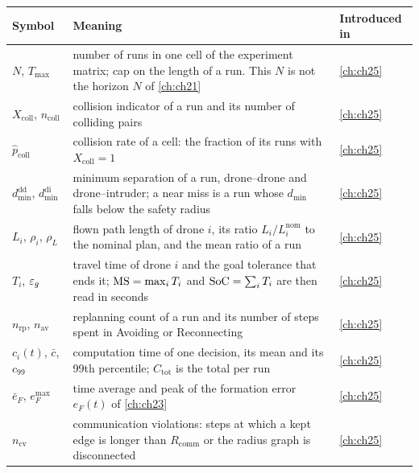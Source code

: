 {\small\renewcommand{\arraystretch}{1.0}%
\noindent\begin{tabularx}{\textwidth}{@{}lYl@{}}
\toprule
\textbf{Symbol} & \textbf{Meaning} & \textbf{Introduced in}\\
\midrule
$N$, $T_{\max}$ & number of runs in one cell of the experiment matrix; cap on the length of a run. This $N$ is not the horizon $N$ of \cref{ch:ch21} & \cref{ch:ch25}\\
$X_{\mathrm{coll}}$, $n_{\mathrm{coll}}$ & collision indicator of a run and its number of colliding pairs & \cref{ch:ch25}\\
$\hat p_{\mathrm{coll}}$ & collision rate of a cell: the fraction of its runs with $X_{\mathrm{coll}}=1$ & \cref{ch:ch25}\\
$d_{\min}^{\mathrm{dd}}$, $d_{\min}^{\mathrm{di}}$ & minimum separation of a run, drone--drone and drone--intruder; a near miss is a run whose $d_{\min}$ falls below the safety radius & \cref{ch:ch25}\\
$L_i$, $\rho_i$, $\rho_L$ & flown path length of drone $i$, its ratio $L_i/L_i^{\mathrm{nom}}$ to the nominal plan, and the mean ratio of a run & \cref{ch:ch25}\\
$T_i$, $\varepsilon_g$ & travel time of drone $i$ and the goal tolerance that ends it; $\mathrm{MS}=\max_i T_i$ and $\mathrm{SoC}=\sum_i T_i$ are then read in seconds & \cref{ch:ch25}\\
$n_{\mathrm{rp}}$, $n_{\mathrm{av}}$ & replanning count of a run and its number of steps spent in Avoiding or Reconnecting & \cref{ch:ch25}\\
$c_i(t)$, $\bar c$, $c_{99}$ & computation time of one decision, its mean and its 99th percentile; $C_{\mathrm{tot}}$ is the total per run & \cref{ch:ch25}\\
$\bar e_F$, $e_F^{\max}$ & time average and peak of the formation error $e_F(t)$ of \cref{ch:ch23} & \cref{ch:ch25}\\
$n_{\mathrm{cv}}$ & communication violations: steps at which a kept edge is longer than $R_{\mathrm{comm}}$ or the radius graph is disconnected & \cref{ch:ch25}\\
\bottomrule
\end{tabularx}\par}
